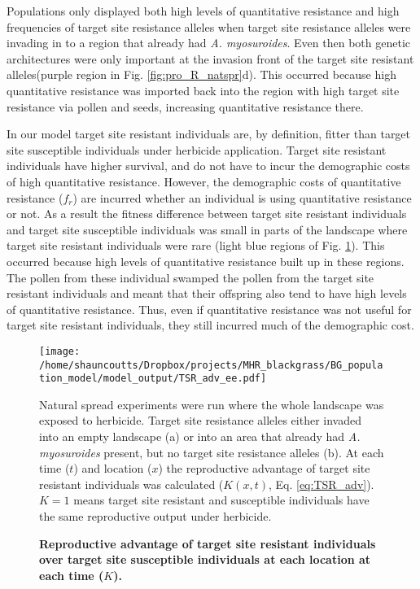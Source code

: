 \documentclass[10pt,letterpaper]{article}
\begin{document}
Populations only displayed both high levels of quantitative resistance and high frequencies of target site resistance alleles when target site resistance alleles were invading in to a region that already had \textit{A. myosuroides}. Even then both genetic architectures were only important at the invasion front of the target site resistant alleles(purple region in Fig. \ref{fig:pro_R_natspr}d). This occurred because high quantitative resistance was imported back into the region with high target site resistance via pollen and seeds, increasing quantitative resistance there.        

In our model target site resistant individuals are, by definition, fitter than target site susceptible individuals under herbicide application. Target site resistant individuals have higher survival, and do not have to incur the demographic costs of high quantitative resistance. However, the demographic costs of quantitative resistance ($f_r$) are incurred whether an individual is using quantitative resistance or not. As a result the fitness difference between target site resistant individuals and target site susceptible individuals was small in parts of the landscape where target site resistant individuals were rare (light blue regions of Fig. \ref{fig:TSR_adv}). This occurred because high levels of quantitative resistance built up in these regions. The pollen from these individual swamped the pollen from the target site resistant individuals and meant that their offspring also tend to have high levels of quantitative resistance. Thus, even if quantitative resistance was not useful for target site resistant individuals, they still incurred much of the demographic cost.

\begin{figure}[!h] 
	\texttt{[image: /home/shauncoutts/Dropbox/projects/MHR\_blackgrass/BG\_population\_model/model\_output/TSR\_adv\_ee.pdf]}
\caption{\bf Reproductive advantage of target site resistant individuals over target site susceptible individuals at each location at each time ($K$).} Natural spread experiments were run where the whole landscape was exposed to herbicide. Target site resistance alleles either invaded into an empty landscape (a) or into an area that already had \textit{A. myosuroides} present, but no target site resistance alleles (b). At each time ($t$) and location ($x$) the reproductive advantage of target site resistant individuals was calculated ($K(x, t)$, Eq. \ref{eq:TSR_adv}). $K = 1$ means  target site resistant and susceptible individuals have the same reproductive output under herbicide.   
\label{fig:TSR_adv}
\end{figure}
\end{document}
